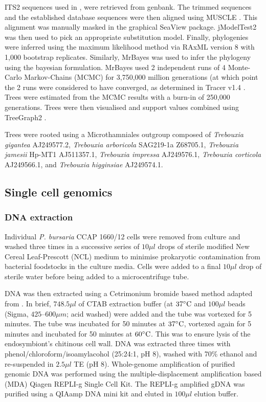 ITS2 sequences used in \citep{Hoshina2010}, \citep{Hoshina2013} were retrieved
from genbank. 
The trimmed sequences and the established database sequences were then
aligned using MUSCLE \citep{Edgar2004}. This alignment was manually masked in the graphical 
SeaView \citep{Gouy2010} package.
jModelTest2 \citep{Guindon2003,Darriba2012} was then used to pick an appropriate substitution model.
Finally, phylogenies were inferred using the maximum likelihood
method via RAxML version 8 \citep{Stamatakis2014} with 1,000 bootstrap replicates.
Similarly, MrBayes \citep{Huelsenbeck2001} was used to infer the phylogeny using the bayesian
formulation.  MrBayes used 2 independent runs of 4 Monte-Carlo Markov-Chains (MCMC) for
3,750,000 million generations (at which point the 2 runs were considered to have converged, 
as determined in Tracer v1.4 \citep{rambaut2007tracer}.  Trees were estimated
from the MCMC results with a burn-in of 250,000 generations.
Trees were then visualised and support values combined using TreeGraph2 \citep{Stover2010}.

Trees were rooted using a Microthamniales outgroup composed of
\textit{Trebouxia gigantea} AJ249577.2, \textit{Trebouxia arboricola} SAG219-1a Z68705.1,
\textit{Trebouxia jamesii} Hp-MT1 AJ511357.1, \textit{Trebouxia impressa} AJ249576.1,
\textit{Trebouxia corticola} AJ249566.1, and \textit{Trebouxia higginsiae} AJ249574.1.

\subsection{Single cell genomics}

\subsubsection{DNA extraction}

Individual \textit{P. bursaria} CCAP 1660/12 cells were removed from culture 
and washed three times in a successive series of 
\(10 \mu l\) drops of sterile modified 
New Cereal Leaf-Prescott (NCL) medium to minimise prokaryotic contamination from 
bacterial foodstocks in the culture media. 
Cells were added to a final \(10\mu l\) drop of sterile water before being added
to a microcentrifuge tube.

DNA was then extracted using a Cetrimonium bromide based method adapted from \citep{Winnepenninckx1993}. 
In brief,  \(748.5 \mu l\) of CTAB extraction buffer (at \(37\celsius\) and \(100 \mu l\) beads (Sigma, \(425 – 600 \mu m\); acid washed) 
were added and the tube was vortexed for 5 minutes. 
The tube was incubated for 50 minutes at \(37\celsius\), 
vortexed again for 5 minutes and incubated for 50 minutes at \(60\celsius\).  
This was to ensure lysis of the endosymbiont's chitinous cell wall.
DNA was extracted three times with phenol/chloroform/isoamylacohol (25:24:1, pH 8), washed with 70\% ethanol and 
re-suspended in \(2.5 \mu l\) TE (pH 8). 
Whole-genome amplification of purified genomic DNA was performed using the multiple-displacement amplification based
(MDA) Qiagen REPLI-g Single Cell Kit. 
The REPLI-g amplified gDNA was purified using a QIAamp DNA mini kit and eluted in \(100 \mu l\) elution buffer.

